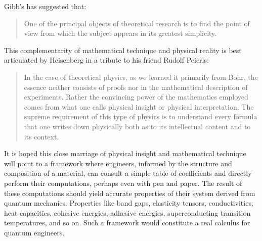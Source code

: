 Gibb's has suggested that:
%
\begin{quote}
One of the principal objects of theoretical research is to
find the point of view from which the subject appears in its
greatest simplicity.
\end{quote}

This complementarity of mathematical technique and physical reality 
is best articulated by Heisenberg in a tribute to his friend Rudolf Peierls:
 
\begin{quote}
In the case of theoretical physics, as we learned it primarily from
Bohr, the essence neither consists of proofs
nor in the mathematical description of experiments.
Rather the convincing power of the mathematics employed comes from
what one calls physical insight or physical interpretation. The supreme
requirement of this type of physics is to understand every formula that
one writes down physically both as to its intellectual content and to its context.
\end{quote}
 
It is hoped this close marriage of physical insight and mathematical technique
will point to a framework where engineers, informed by the
structure and composition of a material, can consult a simple table of
coefficients and directly perform their computations, perhaps even with 
pen and paper. The result of these computations should yield accurate 
properties of their system derived from quantum mechanics.
Properties like band gaps, elasticity tensors, conductivities, 
heat capacities, cohesive energies, adhesive energies, superconducting transition temperatures, 
and so on. Such a framework would constitute a real calculus for quantum engineers.
